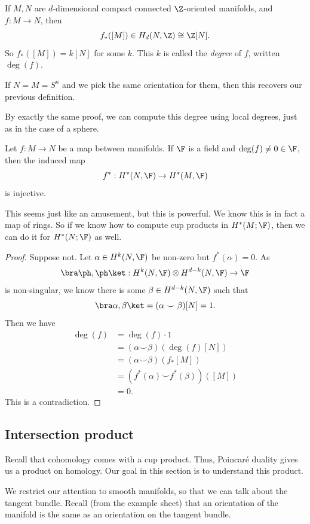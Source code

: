 \documentclass[a4paper]{article}
\theoremstyle{definition}
\begin{document}
\begin{defi}
  If $M, N$ are $d$-dimensional compact connected $\Z$-oriented manifolds, and $f: M \to N$, then
  \[
    f_*([M]) \in H_d(N, \Z) \cong \Z[N].
  \]
  So $f_*([M]) = k [N]$ for some $k$. This $k$ is called the \emph{degree} of $f$, written $\deg (f)$.
\end{defi}

If $N = M = S^n$ and we pick the same orientation for them, then this recovers our previous definition.

By exactly the same proof, we can compute this degree using local degrees, just as in the case of a sphere.

\begin{cor}
  Let $f: M \to N$ be a map between manifolds. If $\F$ is a field and $\deg(f) \not= 0 \in \F$, then the induced map
  \[
    f^*: H^*(N, \F) \to H^*(M, \F)
  \]
  is injective.
\end{cor}
This seems just like an amusement, but this is powerful. We know this is in fact a map of rings. So if we know how to compute cup products in $H^*(M; \F)$, then we can do it for $H^*(N; \F)$ as well.

\begin{proof}
  Suppose not. Let $\alpha \in H^k(N, \F)$ be non-zero but $f^*(\alpha) = 0$. As
  \[
    \bra \ph, \ph \ket: H^k(N, \F) \otimes H^{d - k}(N, \F) \to \F
  \]
  is non-singular, we know there is some $\beta \in H^{d - k}(N, \F)$ such that
  \[
    \bra \alpha, \beta\ket = (\alpha \smile \beta)[N] = 1.
  \]
  Then we have
  \begin{align*}
    \deg(f) &= \deg (f) \cdot 1 \\
    &= (\alpha \smile \beta)(\deg(f) [N]) \\
    &= (\alpha \smile \beta) (f_*[M]) \\
    &= (f^*(\alpha) \smile f^*(\beta))([M])\\
    &= 0.
  \end{align*}
  This is a contradiction.
\end{proof}

\subsection{Intersection product}
Recall that cohomology comes with a cup product. Thus, Poincar\'e duality gives us a product on homology. Our goal in this section is to understand this product.

We restrict our attention to smooth manifolds, so that we can talk about the tangent bundle. Recall (from the example sheet) that an orientation of the manifold is the same as an orientation on the tangent bundle.
\end{document}
